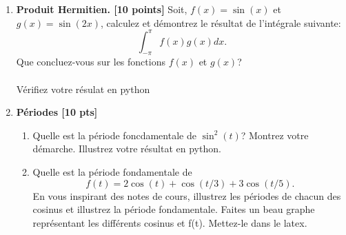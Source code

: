 \documentclass{article}
\begin{document}
\begin{enumerate}

\item {\bf Produit Hermitien. [10 points]} Soit, 
  $f(x) = \sin(x)$ et $g(x) = \sin(2x)$,
  calculez et démontrez le résultat de l'intégrale suivante: 
  $$
  \int_{-\pi}^{\pi} f(x) g(x) dx.
  $$
  Que concluez-vous sur les fonctions $f(x)$ et $g(x)$?
  \\
  \\
  Vérifiez votre résulat en python
\vspace{1cm}


\item  {\bf Périodes [10 pts]}
  \begin{enumerate}
    \vspace{0.5cm}
  \item Quelle est la période foncdamentale de $\sin^2(t)$? Montrez votre
    démarche. Illustrez votre résultat en python.
    \vspace{1cm}    
  \item Quelle est la période fondamentale de 
    $$
    f(t) = 2\cos(t) +    \cos(t/3) + 3\cos(t/5).  
    $$
    En vous inspirant des notes de cours, illustrez
    les périodes de chacun des cosinus et illustrez la période
    fondamentale. Faites un beau graphe représentant les différents
    cosinus et f(t). Mettez-le dans le latex.

\end{enumerate}

\newpage 


\end{enumerate}
\end{document}
